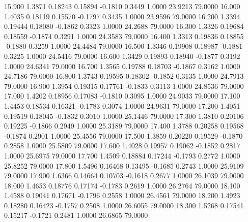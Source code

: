   15.900   1.3871   0.18243   0.15894  -0.1810   0.3449   1.0000  23.9213  79.0000
  16.000   1.4035   0.18119   0.15570  -0.1797   0.3435   1.0000  23.9596  79.0000
  16.200   1.3394   0.19444   0.18080  -0.1862   0.3323   1.0000  24.2688  79.0000
  16.300   1.3326   0.19684   0.18559  -0.1874   0.3291   1.0000  24.3583  79.0000
  16.400   1.3313   0.19836   0.18855  -0.1880   0.3259   1.0000  24.4484  79.0000
  16.500   1.3346   0.19908   0.18987  -0.1881   0.3225   1.0000  24.5416  79.0000
  16.600   1.3429   0.19893   0.18940  -0.1877   0.3192   1.0000  24.6341  79.0000
  16.700   1.3565   0.19788   0.18703  -0.1867   0.3162   1.0000  24.7186  79.0000
  16.800   1.3743   0.19595   0.18302  -0.1852   0.3135   1.0000  24.7913  79.0000
  16.900   1.3954   0.19315   0.17761  -0.1833   0.3113   1.0000  24.8536  79.0000
  17.000   1.4202   0.18956   0.17083  -0.1810   0.3095   1.0000  24.9033  79.0000
  17.100   1.4453   0.18534   0.16321  -0.1783   0.3074   1.0000  24.9631  79.0000
  17.200   1.4051   0.19519   0.18045  -0.1832   0.3010   1.0000  25.1446  79.0000
  17.300   1.3810   0.20106   0.19225  -0.1866   0.2949   1.0000  25.3189  79.0000
  17.400   1.3788   0.20258   0.19568  -0.1874   0.2901   1.0000  25.4556  79.0000
  17.500   1.3859   0.20220   0.19529  -0.1870   0.2858   1.0000  25.5809  79.0000
  17.600   1.4028   0.19957   0.19062  -0.1852   0.2817   1.0000  25.6975  79.0000
  17.700   1.4509   0.18884   0.17244  -0.1793   0.2772   1.0000  25.8252  79.0000
  17.800   1.5496   0.16468   0.13495  -0.1685   0.2743   1.0000  25.9109  79.0000
  17.900   1.6366   0.14664   0.10703  -0.1618   0.2677   1.0000  26.1039  79.0000
  18.000   1.4653   0.18776   0.17174  -0.1783   0.2619   1.0000  26.2764  79.0000
  18.100   1.4588   0.19041   0.17671  -0.1796   0.2558   1.0000  26.4561  79.0000
  18.200   1.4923   0.18280   0.16423  -0.1757   0.2508   1.0000  26.6055  79.0000
  18.300   1.5268   0.17541   0.15217  -0.1721   0.2481   1.0000  26.6865  79.0000
